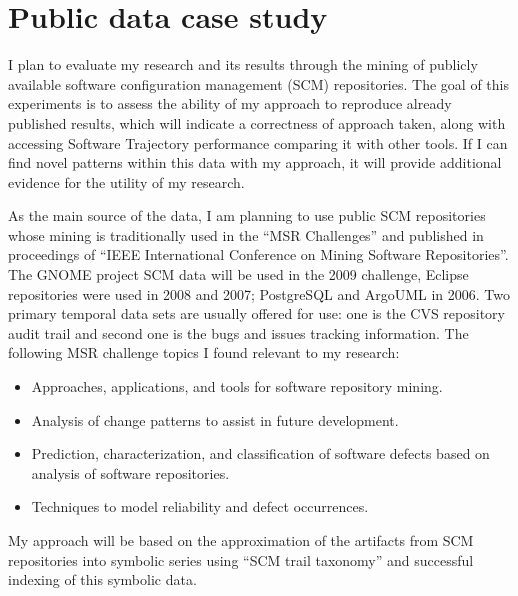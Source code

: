 \section{Public data case study}\label{public.evaluation}
I plan to evaluate my research and its results through the mining of publicly available software configuration management (SCM) repositories. The goal of this experiments is to assess the ability of my approach to reproduce already published results, which will indicate a correctness of approach taken, along with accessing Software Trajectory performance comparing it with other tools. If I can find novel patterns within this data with my approach, it will provide additional evidence for the utility of my research.

As the main source of the data, I am planning to use public SCM repositories whose mining is traditionally used in the ``MSR Challenges'' \cite{citeulike:5043676} and published in proceedings of ``IEEE International Conference on Mining Software Repositories''. The GNOME project SCM data will be used in the 2009 challenge, Eclipse repositories were used in 2008 and 2007; PostgreSQL and ArgoUML in 2006. Two primary temporal data sets are usually offered for use: one is the CVS repository audit trail and second one is the bugs and issues tracking information. The following MSR challenge topics I found relevant to my research:
\begin{itemize}
  \item Approaches, applications, and tools for software repository mining.
  \item Analysis of change patterns to assist in future development.
	\item Prediction, characterization, and classification of software defects based on analysis of software repositories.
	\item Techniques to model reliability and defect occurrences.
\end{itemize}
My approach will be based on the approximation of the artifacts from SCM repositories into symbolic series using ``SCM trail taxonomy'' and successful indexing of this symbolic data. 

